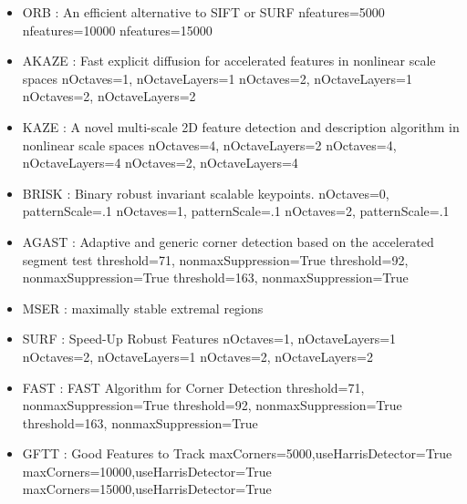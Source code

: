 \documentclass[]{elsarticle}
\begin{document}
	\begin{itemize}
		\item ORB : An efficient alternative to SIFT or SURF
		\subitem[1] nfeatures=5000
		\subitem[2] nfeatures=10000
		\subitem[3] nfeatures=15000
		
		\item AKAZE : Fast explicit diffusion for accelerated features in nonlinear scale spaces
		\subitem[1] nOctaves=1, nOctaveLayers=1
		\subitem[2] nOctaves=2, nOctaveLayers=1
		\subitem[3] nOctaves=2, nOctaveLayers=2
		
		\item KAZE : A novel multi-scale 2D feature detection and description algorithm in nonlinear scale spaces \cite{rs10050756}
		\subitem[1] nOctaves=4, nOctaveLayers=2
		\subitem[2] nOctaves=4, nOctaveLayers=4
		\subitem[3] nOctaves=2, nOctaveLayers=4
		
		\item BRISK : Binary robust invariant scalable keypoints.
		\subitem[1] nOctaves=0, patternScale=.1
		\subitem[2] nOctaves=1, patternScale=.1
		\subitem[3] nOctaves=2, patternScale=.1
		
		\item AGAST : Adaptive and generic corner detection based on the accelerated segment test
		\subitem[1] threshold=71, nonmaxSuppression=True
		\subitem[2] threshold=92, nonmaxSuppression=True
		\subitem[3] threshold=163, nonmaxSuppression=True
		
		\item MSER : maximally stable extremal regions
		
		\item SURF : Speed-Up Robust Features
		\subitem[1] nOctaves=1, nOctaveLayers=1
		\subitem[2] nOctaves=2, nOctaveLayers=1
		\subitem[3] nOctaves=2, nOctaveLayers=2
		
		\item FAST : FAST Algorithm for Corner Detection
		\subitem[1] threshold=71, nonmaxSuppression=True
		\subitem[2] threshold=92, nonmaxSuppression=True
		\subitem[3] threshold=163, nonmaxSuppression=True
		
		\item GFTT : Good Features to Track
		\subitem[1] maxCorners=5000,useHarrisDetector=True
		\subitem[2] maxCorners=10000,useHarrisDetector=True
		\subitem[3] maxCorners=15000,useHarrisDetector=True
	\end{itemize}
	
\end{document}
